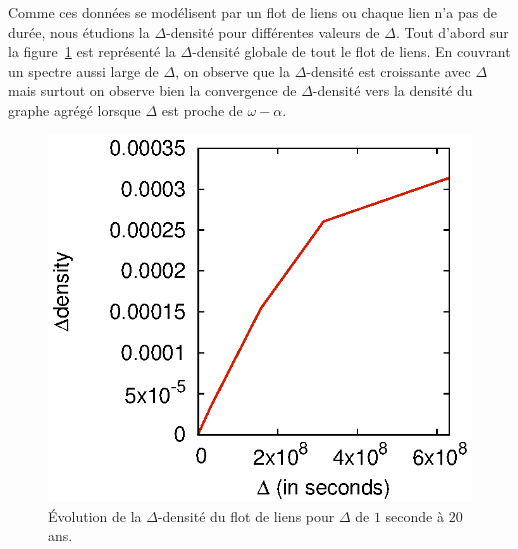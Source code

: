 Comme ces données se modélisent par un flot de liens ou chaque lien n'a pas de durée, nous étudions la $\Delta$-densité pour différentes valeurs de $\Delta$.
Tout d'abord sur la figure~\ref{fig:dens_fil_discusion} est représenté la $\Delta$-densité globale de tout le flot de liens.
En couvrant un spectre aussi large de $\Delta$, on observe que la $\Delta$-densité est croissante avec $\Delta$ mais surtout on observe bien la convergence de $\Delta$-densité vers la densité du graphe agrégé lorsque $\Delta$ est proche de $\omega - \alpha$.

\begin{figure}
	\centering
	\includegraphics[width=0.48\linewidth]{img/mailing/global_linlin.eps}
	\caption{Évolution de la $\Delta$-densité du flot de liens pour $\Delta$ de $1$ seconde à $20$ ans.}
	\label{fig:dens_fil_discusion}
\end{figure}

